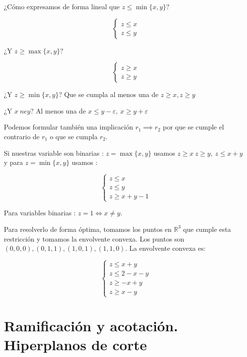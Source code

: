 \documentclass[openany]{book}
\begin{document}
\begin{exercise}
  ¿Cómo expresamos de forma lineal que $ z \leq \min \{x,y\} $? 
  
  $$ \left\{
  \begin{array}{l}
    z\leq x \\
    z\leq y
  \end{array}
  \right. $$
  
  ¿Y $ z \geq \max \{x,y\} $?

  $$ \left\{
  \begin{array}{l}
    z\geq x \\
    z \geq y
  \end{array}
  \right. $$

  ¿Y $ z \geq \min \{x,y\} $? Que se cumpla al menos una de $ z\geq x, z\geq y $

  ¿Y $ x\ ne y $? Al menos una de $ x \leq y - \varepsilon ,\ x \geq y+ \varepsilon $

  Podemos formular también una implicación $ r_1 \implies r_2 $ por que se cumple el contrario de $ r_1 $ o que se cumpla $ r_2 $.


  Si nuestras variable son binarias : $ z = \max \{x,y\} $ usamos $ z \geq x\ z \geq y,\ z\leq x+y $ y para $ z = \min \{x,y\} $ usamos :

  $$ \left\{
  \begin{array}{l}
    z \leq x \\
    z \leq y \\
    z \geq x+y-1
  \end{array}
  \right. $$

  Para variables binarias : $ z = 1 \iff x \ne y $.

  Para resolverlo de forma óptima, tomamos los puntos en $ \mathbb{R}^3 $ que cumple esta restricción y tomamos la envolvente convexa. Los puntos son $ (0,0,0), (0,1,1), (1,0,1), (1,1,0) $. La envolvente convexa es:

  $$ \left\{
  \begin{array}{ll}
    z \leq x +y \\
    z \leq 2-x-y \\
    z \geq -x+y \\
    z\geq x-y
  \end{array}
  \right. $$

\end{exercise}





\chapter{Ramificación y acotación. Hiperplanos de corte}
\end{document}
